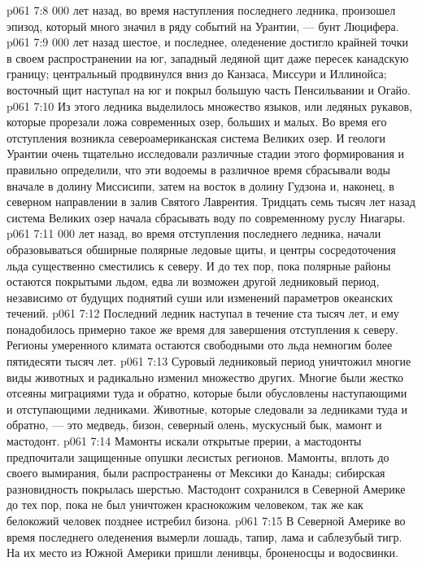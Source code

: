 \vs p061 7:8  000 лет назад, во время наступления последнего ледника, произошел эпизод, который много значил в ряду событий на Урантии, --- бунт Люцифера.
\vs p061 7:9  000 лет назад шестое, и последнее, оледенение достигло крайней точки в своем распространении на юг, западный ледяной щит даже пересек канадскую границу; центральный продвинулся вниз до Канзаса, Миссури и Иллинойса; восточный щит наступал на юг и покрыл большую часть Пенсильвании и Огайо.
\vs p061 7:10 Из этого ледника выделилось множество языков, или ледяных рукавов, которые прорезали ложа современных озер, больших и малых. Во время его отступления возникла североамериканская система Великих озер. И геологи Урантии очень тщательно исследовали различные стадии этого формирования и правильно определили, что эти водоемы в различное время сбрасывали воды вначале в долину Миссисипи, затем на восток в долину Гудзона и, наконец, в северном направлении в залив Святого Лаврентия. Тридцать семь тысяч лет назад система Великих озер начала сбрасывать воду по современному руслу Ниагары.
\vs p061 7:11  000 лет назад, во время отступления последнего ледника, начали образовываться обширные полярные ледовые щиты, и центры сосредоточения льда существенно сместились к северу. И до тех пор, пока полярные районы остаются покрытыми льдом, едва ли возможен другой ледниковый период, независимо от будущих поднятий суши или изменений параметров океанских течений.
\vs p061 7:12 Последний ледник наступал в течение ста тысяч лет, и ему понадобилось примерно такое же время для завершения отступления к северу. Регионы умеренного климата остаются свободными ото льда немногим более пятидесяти тысяч лет.
\vs p061 7:13 Суровый ледниковый период уничтожил многие виды животных и радикально изменил множество других. Многие были жестко отсеяны миграциями туда и обратно, которые были обусловлены наступающими и отступающими ледниками. Животные, которые следовали за ледниками туда и обратно, --- это медведь, бизон, северный олень, мускусный бык, мамонт и мастодонт.
\vs p061 7:14 Мамонты искали открытые прерии, а мастодонты предпочитали защищенные опушки лесистых регионов. Мамонты, вплоть до своего вымирания, были распространены от Мексики до Канады; сибирская разновидность покрылась шерстью. Мастодонт сохранился в Северной Америке до тех пор, пока не был уничтожен краснокожим человеком, так же как белокожий человек позднее истребил бизона.
\vs p061 7:15 В Северной Америке во время последнего оледенения вымерли лошадь, тапир, лама и саблезубый тигр. На их место из Южной Америки пришли ленивцы, броненосцы и водосвинки.
